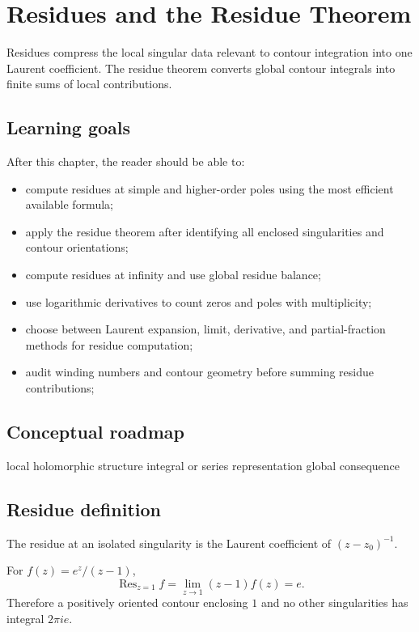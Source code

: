 \chapter{Residues and the Residue Theorem}
\label{ch:iv10}

Residues compress the local singular data relevant to contour integration into one Laurent coefficient. The residue theorem converts global contour integrals into finite sums of local contributions.

\section*{Learning goals}
After this chapter, the reader should be able to:
\begin{itemize}
\item compute residues at simple and higher-order poles using the most efficient available formula;
\item apply the residue theorem after identifying all enclosed singularities and contour orientations;
\item compute residues at infinity and use global residue balance;
\item use logarithmic derivatives to count zeros and poles with multiplicity;
\item choose between Laurent expansion, limit, derivative, and partial-fraction methods for residue computation;
\item audit winding numbers and contour geometry before summing residue contributions;
\end{itemize}
\section*{Conceptual roadmap}
\volroadmap
  {local holomorphic structure}
  {integral or series representation}
  {global consequence}

\section{Residue definition}
The residue at an isolated singularity is the Laurent coefficient of $(z-z_0)^{-1}$.

\begin{example}\label{ex:iv10-expand-01}
For \(f(z)=e^z/(z-1)\),
\[
\operatorname{Res}_{z=1}f=\lim_{z\to1}(z-1)f(z)=e.
\]
Therefore a positively oriented contour enclosing \(1\) and no other singularities has integral \(2\pi i e\).
\end{example}
